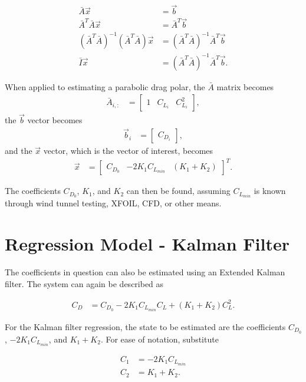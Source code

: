 \begin{align}
\bar{A}\vec{x}&=\vec{b}\\
\bar{A}^T\bar{A}\vec{x} &= \bar{A}^T\vec{b}\\
(\bar{A}^T\bar{A})^{-1}(\bar{A}^T \bar{A})\vec{x} &= (\bar{A}^T\bar{A})^{-1}\bar{A}^T\vec{b}\\
\bar{I}\vec{x} &=(\bar{A}^T\bar{A})^{-1}\bar{A}^T\vec{b}.
\end{align}

When applied to estimating a parabolic drag polar, the $\bar{A}$ matrix becomes
\begin{align}
\bar{A}_{i,:} &= 
\begin{bmatrix}
1 & C_{L_i} & C^2_{L_i}
\end{bmatrix},
\end{align}
\noindent
the $\vec{b}$ vector becomes
\begin{align}
\vec{b}_i &=
\begin{bmatrix}
C_{D_i}
\end{bmatrix},
\end{align}
\noindent
and the $\vec{x}$ vector, which is the vector of interest, becomes
\begin{align}
\vec{x} &=
\begin{bmatrix}
C_{D_0} & -2K_1C_{L_{min}} & (K_1+K_2)
\end{bmatrix}^T.
\end{align}

The coefficients $C_{D_0}$, $K_1$, and $K_2$ can then be found, assuming $C_{L_{min}}$ is known through wind tunnel testing, XFOIL, CFD, or other means.

\section{Regression Model - Kalman Filter}
The coefficients in question can also be estimated using an Extended Kalman filter. The system can again be described as 

\begin{align}
C_D &= C_{D_0}-2K_1C_{L_{min}}C_L+(K_1+K_2)C^2_L.
\end{align}

For the Kalman filter regression, the state to be estimated are the coefficients $C_{D_0}$, $-2K_1C_{L_{min}}$, and $K_1+K_2$. For ease of notation, substitute

\begin{align}
C_1 &= -2K_1C_{L_{min}}\\
C_2 &= K_1+K_2.
\end{align}

